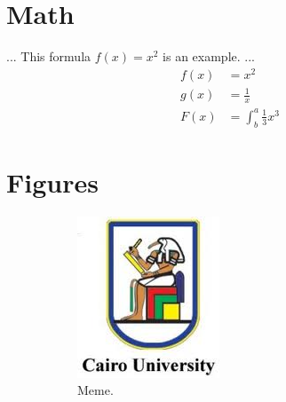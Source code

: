 \documentclass[a4paper,12pt]{report}
\begin{document}
    \section{Math}
    ...
    This formula $f(x) = x^2$ is an example.
    ...
    \begin{align*}
        f(x) &= x^2\\
        g(x) &= \frac{1}{x}\\
        F(x) &= \int^a_b \frac{1}{3}x^3
      \end{align*}
    
    \section{Figures}
    

    \begin{figure}[h!]
    \centering
    \begin{subfigure}[b]{0.4\linewidth}
        \includegraphics[width=\linewidth]{slogan.jpg}
        \caption{Meme.}
    \end{subfigure}
    \begin{subfigure}[b]{0.4\linewidth}

\end{subfigure}
\end{figure}
\end{document}
